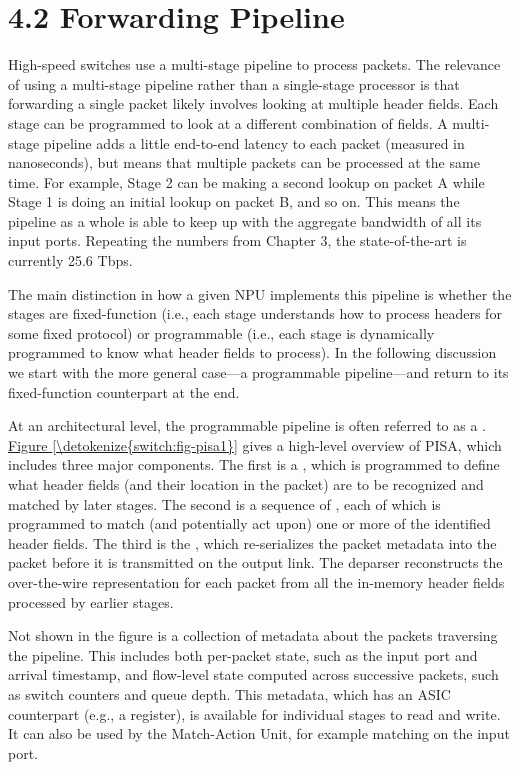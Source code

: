 \documentclass[letterpaper,11pt,english]{sphinxmanual}
\begin{document}
\section{4.2 Forwarding Pipeline}
\label{\detokenize{switch:forwarding-pipeline}}
High-speed switches use a multi-stage pipeline to process packets. The
relevance of using a multi-stage pipeline rather than a single-stage
processor is that forwarding a single packet likely involves looking
at multiple header fields. Each stage can be programmed to look at a
different combination of fields. A multi-stage pipeline adds a little
end-to-end latency to each packet (measured in nanoseconds), but means
that multiple packets can be processed at the same time. For example,
Stage 2 can be making a second lookup on packet A while Stage 1 is
doing an initial lookup on packet B, and so on. This means the
pipeline as a whole is able to keep up with the aggregate bandwidth of
all its input ports. Repeating the numbers from Chapter 3, the
state-of-the-art is currently 25.6 Tbps.

The main distinction in how a given NPU implements this pipeline is
whether the stages are fixed-function (i.e., each stage understands
how to process headers for some fixed protocol) or programmable (i.e.,
each stage is dynamically programmed to know what header fields to
process). In the following discussion we start with the more general
case—a programmable pipeline—and return to its fixed-function
counterpart at the end.

At an architectural level, the programmable pipeline is often referred
to as a .
\hyperref[\detokenize{switch:fig-pisa1}]{Figure \ref{\detokenize{switch:fig-pisa1}}} gives a high-level overview of PISA,
which includes three major components. The first is a , which
is programmed to define what header fields (and their location in the
packet) are to be recognized and matched by later stages. The second
is a sequence of , each of which is programmed to
match (and potentially act upon) one or more of the identified header
fields. The third is the , which re-serializes the packet
metadata into the packet before it is transmitted on the output
link. The deparser reconstructs the over-the-wire representation for
each packet from all the in-memory header fields processed by earlier
stages.

Not shown in the figure is a collection of metadata about the packets
traversing the pipeline. This includes both per-packet state, such as
the input port and arrival timestamp, and flow-level state computed
across successive packets, such as switch counters and queue
depth. This metadata, which has an ASIC counterpart (e.g., a register),
is available for individual stages to read and write. It can also be
used by the Match-Action Unit, for example matching on the input port.
\end{document}
